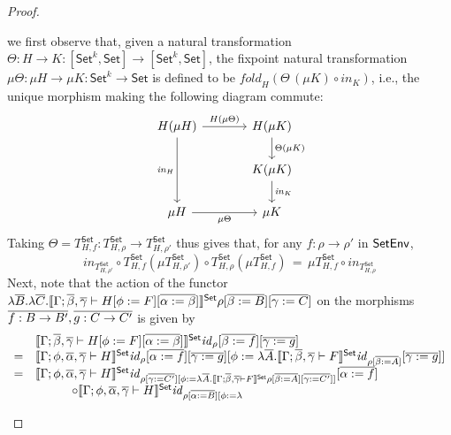 \documentclass[acmsmall,review,anonymous]{acmart}
\theoremstyle{definition}
\newcommand{\set}{\mathsf{Set}}
\renewcommand{\id}{\mathit{id}}
\begin{document}
\begin{proof}
\begin{itemize}
we first observe that, given a natural transformation $\Theta : H \to
K : [\set^k, \set] \to [\set^k, \set]$, the fixpoint natural
transformation $\mu \Theta : \mu H \to \mu K : \set^k \to \set$ is
defined to be $\mathit{fold}_{H}(\Theta\,(\mu K) \circ
\mathit{in}_{K})$, i.e., the unique morphism making the following
diagram commute:\label{page:dia1}
{\footnotesize
\[\begin{tikzcd}[column sep = large]
H(\mu H)
	\ar[dd, "{\mathit{in}_H}"']
	\ar[r, "{H(\mu \Theta)}"]
& H(\mu K)
	\ar[d, "{\Theta (\mu K)}"] \\
& K(\mu K)
	\ar[d, "{\mathit{in}_K}"] \\
\mu H
	\ar[r, "{\mu \Theta}"']
& \mu K
\end{tikzcd}\]}
Taking $\Theta = T^{\set}_{H,f}: T^{\set}_{H,\rho} \to
T^{\set}_{H,\rho'}$ thus gives that, for any $f : \rho \to \rho'$ in
$\mathsf{SetEnv}$,
\begin{equation}\label{eq:mu-sigma-def}
\mathit{in}_{T^{\set}_{H,\rho'}} \circ 
T^{\set}_{H,f} (\mu T^{\set}_{H,\rho'}) \circ 
T^{\set}_{H,\rho}(\mu T^{\set}_{H,f}) \,=\, 
\mu T^{\set}_{H,f} \circ \mathit{in}_{T^{\set}_{H,\rho}}
\end{equation}
Next, note that the action of the functor
$\lambda \ol{B}. \lambda \ol{C}. \setsem{\Gamma; \ol{\beta},
  \ol{\gamma} \vdash H[\phi := F][\ol{\alpha := \beta}]}\rho
        [\ol{\beta := B}] [\ol{\gamma := C}]$
on the morphisms $\overline{f : B \to B'}, \overline{g : C \to C'}$ is given by
\[\begin{array}{ll}
 & \setsem{\Gamma; \ol{\beta}, \ol{\gamma} \vdash H[\phi :=
      F][\ol{\alpha := \beta}]} \id_{\rho} [\ol{\beta := f}]
           [\ol{\gamma := g}]\\
= & \setsem{\Gamma; \phi, \ol{\alpha}, \ol{\gamma} \vdash H}
\id_{\rho}[\ol{\alpha := f}] [\ol{\gamma := g}][\phi := \lambda
  \ol{A}. \setsem{\Gamma; \ol{\beta}, \ol{\gamma} \vdash F} \id_{\rho
    [\ol{\beta := A}]} [\ol{\gamma := g}]] \\ 
=& \setsem{\Gamma; \phi, \ol{\alpha}, \ol{\gamma} \vdash H} \id_{\rho
  [\ol{\gamma := C'}][\phi := \lambda \ol{A}. \setsem{\Gamma;
      \ol{\beta}, \ol{\gamma} \vdash F} \rho [\ol{\beta := A}]
    [\ol{\gamma := C'}]]} [\ol{\alpha := f}] \\
&\hspace{3em} \circ \setsem{\Gamma; \phi, \ol{\alpha}, \ol{\gamma}
  \vdash H} \id_{\rho [\ol{\alpha := B}][\phi := \lambda
}
\end{array}\]
\end{itemize}
\end{proof}
\end{document}
